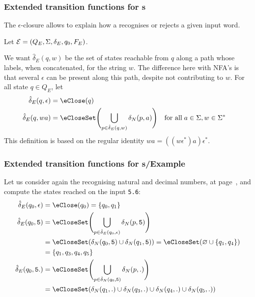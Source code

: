 % 
\begin{frame}
\frametitle{Extended transition functions for {\eNFA}s}

The \(\epsilon\)-closure allows to explain how a \eNFA recognises or
rejects a given input word.

\bigskip

Let \({\cal E} = (Q_E, \Sigma, \delta_E, q_0, F_E)\).

\bigskip

We want \(\hat{\delta}_E (q, w)\) be the set of states reachable from
\(q\) along a path whose labels, when concatenated, for the string
\(w\). The difference here with NFA's is that several \(\epsilon\) can
be present along this path, despite not contributing to \(w\).
For all state \(q \in Q_E\), let
\begin{align*}
   \hat{\delta}_E (q, \epsilon)
&= \eClose (q)\\
   \hat{\delta}_E (q, wa)
&= \eCloseSet \Biggl(\bigcup_{p \in \hat{\delta}_E (q, w)}{\delta_N (p,
     a)}\Biggr)
&& \text{for all} \; a \in \Sigma, w \in \Sigma^{*}
\end{align*}
This definition is based on the regular identity \(wa =
((w\epsilon^{*})a)\epsilon^{*}\).

\end{frame}

% 
\begin{frame}[containsverbatim]
\frametitle{Extended transition functions for {\eNFA}s/Example}

Let us consider again the \eNFA recognising natural and decimal
numbers, at page~\pageref{enfa_num}, and compute the states reached on
the input \verb+5.6+:
\begin{align*}
   \hat{\delta}_E (q_0, \epsilon)
&= \eClose (q_0) = \{q_0, q_1\}\\
   \hat{\delta}_E (q_0, \mathtt{5})
&= \eCloseSet \Biggl( \bigcup_{p \in \hat{\delta}_E (q_0,
   \epsilon)}{\delta_N (p, \mathtt{5})} \Biggr)\\
&= \eCloseSet (\delta_N (q_0, \mathtt{5}) \cup \delta_N (q_1,
   \mathtt{5})) = \eCloseSet (\varnothing \cup \{q_1, q_4\})\\
&= \{q_1, q_3, q_4, q_5\}\\
   \hat{\delta}_E (q_0, \mathtt{5.})
&= \eCloseSet \Biggl( \bigcup_{p \in \hat{\delta}_N (q_0,
   \mathtt{5})}{\delta_N (p, \mathtt{.})} \Biggr)\\
&= \eCloseSet (\delta_N (q_1, \mathtt{.}) \cup \delta_N (q_3,
   \mathtt{.}) \cup \delta_N (q_4, \mathtt{.}) \cup \delta_N (q_5,
   \mathtt{.}))
\end{align*}

\end{frame}

